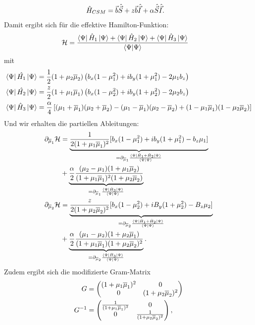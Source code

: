 \begin{align}
    \hat{H}_{CSM} &= \vec{b}\hat{\vec{S}} +  z\vec{b}\hat{\vec{I}} + \alpha \hat{\vec{S}}\hat{\vec{I}}\space.
\end{align}
Damit ergibt sich für die effektive Hamilton-Funktion: 
\begin{align}
    \mathcal{H} &= \frac{\bra{\Psi}\hat{H}_1\ket{\Psi}+ \bra{\Psi}\hat{H}_2\ket{\Psi} +\bra{\Psi}\hat{H}_3\ket{\Psi}}{\bra{\Psi}\ket{\Psi}}
\end{align}
mit
\begin{align}
   \bra{\Psi}\hat{H_1}\ket{\Psi} &= \frac{1}{2}(1+\mu_2\overline{\mu}_2)\left(b_x(1-\mu_1^2) + ib_y(1+\mu_1^2) - 2\mu_1 b_z\right)\\
   \bra{\Psi}\hat{H_2}\ket{\Psi} &= \frac{z}{2}(1+\mu_1\overline{\mu}_1)\left(b_x(1-\mu_2^2) + ib_y(1+\mu_2^2) - 2\mu_2 b_z\right)\\
   \bra{\Psi}\hat{H}_3\ket{\Psi} &= \frac{\alpha}{4}\left[( \mu_1 + \overline{\mu}_1)( \mu_2 + \overline{\mu}_2) - (\mu_1-\overline{\mu}_1)(\mu_2 - \overline{\mu}_2) + (1-\mu_1\overline{\mu}_1)(1-\mu_2\overline{\mu}_2)\right]
\end{align}  
Und wir erhalten die partiellen Ableitungen:
\begin{align}
    \partial_{\overline{\mu}_1}\mathcal{H} &= \underbrace{\frac{1}{2(1+\mu_1\overline{\mu}_1)^2}[b_x(1-\mu_1^2) + ib_y(1+\mu_1^2) - b_z\mu_1]}_{= \partial_{\overline{\mu}_1} \frac{\bra{\Psi}\hat{H}_1 + \hat{H}_2\ket{\Psi}}{\bra{\Psi}\ket{\Psi}}} \nonumber\\
    &+ \underbrace{\frac{\alpha}{2}\frac{(\mu_2 -\mu_1)(1+\mu_1\overline{\mu}_2)}{(1+\mu_1\overline{\mu}_1)^2(1+\mu_2\overline{\mu}_2)}}_{= \partial_{\overline{\mu}_1} \frac{\bra{\Psi}\hat{H}_3\ket{\Psi}}{\bra{\Psi}\ket{\Psi}}}\\
    \partial_{\overline{\mu}_2}\mathcal{H} &= \underbrace{\frac{z}{2(1+\mu_2\overline{\mu}_2)^2}[b_x(1-\mu_2^2) + iB_y(1+\mu_2^2) - B_z\mu_2]}_{= \partial_{\overline{\mu}_2} \frac{\bra{\Psi}\hat{H}_1 + \hat{H}_2\ket{\Psi}}{\bra{\Psi}\ket{\Psi}}} \nonumber \\
    &+ \underbrace{\frac{\alpha}{2}\frac{(\mu_1 -\mu_2)(1+\mu_2\overline{\mu}_1)}{(1+\mu_1\overline{\mu}_1)(1+\mu_2\overline{\mu}_2)^2}}_{= \partial_{\overline{\mu}_2} \frac{\bra{\Psi}\hat{H}_3\ket{\Psi}}{\bra{\Psi}\ket{\Psi}}}\space .
\end{align}
Zudem ergibt sich die modifizierte Gram-Matrix
\begin{align}
    G &=
    \begin{pmatrix}
        (1+\mu_1\overline{\mu}_1)^2 & 0 \\
        0 &(1+\mu_2\overline{\mu}_2)^2
    \end{pmatrix} \\
    G^{-1} &=
    \begin{pmatrix}
        \frac{1}{(1+\mu_1\overline{\mu}_1)^2} & 0 \\
        0 &\frac{1}{(1+\mu_2\overline{\mu}_2)^2}
    \end{pmatrix}\space ,
\end{align}
